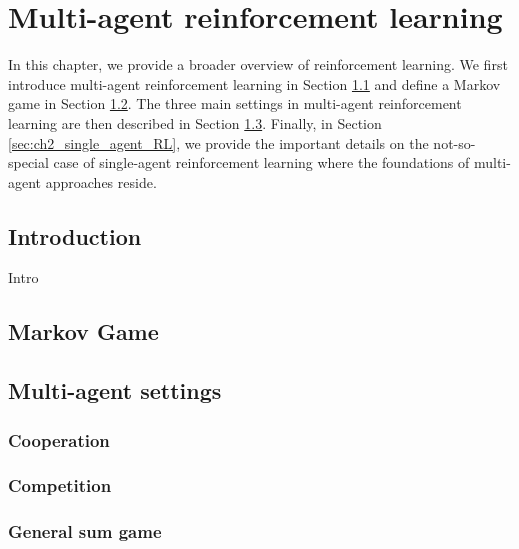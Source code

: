 \chapter{Multi-agent reinforcement learning} \label{ch:marl}

\begin{chapter_outline}

In this chapter, we provide a broader overview of reinforcement learning.
We first introduce multi-agent reinforcement learning in Section \ref{sec:ch2_Introduction} and define a Markov game in Section \ref{sec:ch2_Markov_Game}.
The three main settings in multi-agent reinforcement learning are then described in Section \ref{sec:ch2_multi_agent_settings}.
Finally, in Section \ref{sec:ch2_single_agent_RL}, we provide the important details on the not-so-special case of single-agent reinforcement learning where the foundations of multi-agent approaches reside.

\end{chapter_outline}

\section{Introduction} 
\label{sec:ch2_Introduction}
Intro

\section{Markov Game} 
\label{sec:ch2_Markov_Game}

\section{Multi-agent settings} 
\label{sec:ch2_multi_agent_settings}

\subsection{Cooperation} 
\label{sec:ch2_Cooperation}

\subsection{Competition} 
\label{sec:ch2_Competition}

\subsection{General sum game} 
\label{sec:ch2_general_sum_game}

